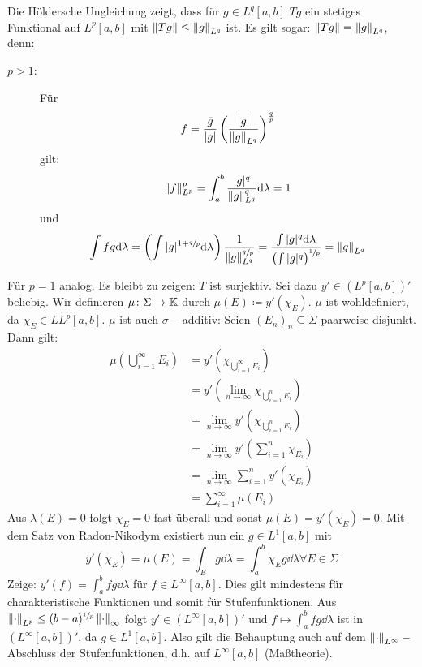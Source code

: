 \begin{beweis}
	Die H\"oldersche Ungleichung zeigt, dass f\"ur $ g\in L^q[a,b] $ $ Tg $ ein stetiges Funktional auf $ L^p[a,b] $ mit $ \left\|Tg\right\|\leq\left\|g\right\|_{L^q} $ ist. Es gilt sogar: $ \left\|Tg\right\|=\left\|g\right\|_{L^q} $, denn:
	\begin{description}
		\item[$ p>1 $:] F\"ur \[ f=\frac{\bar g}{|g|}\left(\frac{|g|}{\left\|g\right\|_{L^q}}\right)^\frac{q}{p} \]
			gilt:
			\[ \left\|f\right\|_{L^p}^p=\int_a^b\frac{|g|^q}{\left\|g\right\|_{L^q}^q}\mathrm d\lambda=1 \]
			und
			\[ \int fg\mathrm d\lambda=\left(\int |g|^{1+\sfrac{q}{p}}\mathrm d\lambda\right)\frac{1}{\left\|g\right\|_{L^q}^{\sfrac{q}{p}}}=\frac{\int|g|^q\mathrm d\lambda}{\left(\int|g|^q\right)^{\sfrac{1}{p}}}=\left\|g\right\|_{L^q} \]
	\end{description}
	F\"ur $ p=1 $ analog. Es bleibt zu zeigen: $ T $ ist surjektiv. Sei dazu $ y'\in (L^p[a,b])' $ beliebig. Wir definieren $ \mu\colon\Sigma\rightarrow\mathbb{K} $ durch $ \mu(E)\coloneqq y'(\chi_E) $. $ \mu $ ist wohldefiniert, da $ \chi_E\in L L^p[a,b] $. $ \mu $ ist auch $ \sigma- $additiv:
	Seien $ (E_n)_n\subseteq\Sigma $ paarweise disjunkt. Dann gilt:
	\begin{align*} \mu\left(\bigcup_{i=1}^\infty E_i\right)&=y'\left(\chi_{\bigcup_{i=1}^\infty E_i}\right)\\&=y'\left(\lim_{n\to\infty}\chi_{\bigcup_{i=1}^n E_i}\right)\\&=\lim_{n\to\infty}y'\left(\chi_{\bigcup_{i=1}^n E_i}\right)\\&=\lim_{n\to\infty}y'\left(\sum_{i=1}^{n}\chi_{E_i}\right)\\&=\lim_{n\to\infty}\sum_{i=1}^n y'(\chi_{E_i})\\&=\sum_{i=1}^{\infty}\mu(E_i) \end{align*}
	Aus $ \lambda(E)=0 $ folgt $ \chi_E=0 $ fast \"uberall und sonst $ \mu(E)=y'(\chi_E)=0 $. Mit dem Satz von Radon-Nikodym existiert nun ein $ g\in L^1[a,b] $ mit
	\[ y'(\chi_E)=\mu(E)=\int_E g\dd\lambda=\int_a^b\chi_E g\dd\lambda\forall E\in\Sigma \]
	Zeige: $ y'(f)=\int_a^b fg\dd\lambda $ f\"ur $ f\in L^\infty[a,b] $. Dies gilt mindestens f\"ur charakteristische Funktionen und somit f\"ur Stufenfunktionen. Aus $ \left\|\cdot\right\|_{L^p}\leq(b-a)^{\sfrac{1}{p}}\left\|\cdot\right\|_\infty $ folgt $ y'\in (L^\infty[a,b])' $ und $ f\mapsto\int_a^b fg\dd\lambda $ ist in $ (L^\infty[a,b])' $, da $ g\in L^1[a,b] $. Also gilt die Behauptung auch auf dem $ \left\|\cdot\right\|_{L^\infty}- $Abschluss der Stufenfunktionen, d.h. auf $ L^\infty[a,b] $ (Ma\ss theorie).\\

\end{beweis}
